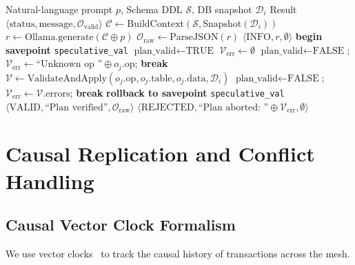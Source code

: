 \begin{algorithm}[!t]
\caption{LLM Tool-Call Decomposition and Speculative Validation}
\label{alg:llm_pipeline}
\begin{algorithmic}[1]
\Require Natural-language prompt $p$, Schema DDL $\mathcal{S}$, DB snapshot $\mathcal{D}_i$
\Ensure Result $\langle \text{status}, \text{message}, \mathcal{O}_{\text{valid}} \rangle$
\State $\mathcal{C} \gets \text{BuildContext}(\mathcal{S}, \text{Snapshot}(\mathcal{D}_i))$ 
\State $r \gets \text{Ollama.generate}(\mathcal{C} \oplus p)$ 
\State $\mathcal{O}_{\text{raw}} \gets \text{ParseJSON}(r)$ 
    \State \Return $\langle \text{INFO}, r, \emptyset \rangle$ 
\EndIf
\State \textbf{begin savepoint} \texttt{speculative\_val}
\State $\text{plan\_valid} \gets \text{TRUE}$
\State $\mathcal{V}_{\text{err}} \gets \emptyset$
        \State $\text{plan\_valid} \gets \text{FALSE}$; $\mathcal{V}_{\text{err}} \gets \text{``Unknown op ''} \oplus o_j.\text{op}$; \textbf{break}
    \EndIf
    \State $\mathcal{V} \gets \text{ValidateAndApply}(o_j.\text{op}, o_j.\text{table}, o_j.\text{data}, \mathcal{D}_i)$
        \State $\text{plan\_valid} \gets \text{FALSE}$; $\mathcal{V}_{\text{err}} \gets \mathcal{V}.\text{errors}$; \textbf{break}
    \EndIf
\EndFor
\State \textbf{rollback to savepoint} \texttt{speculative\_val}
    \State \Return $\langle \text{VALID}, \text{``Plan verified''}, \mathcal{O}_{\text{raw}} \rangle$
\Else
    \State \Return $\langle \text{REJECTED}, \text{``Plan aborted: ''} \oplus \mathcal{V}_{\text{err}}, \emptyset \rangle$
\EndIf
\end{algorithmic}
\end{algorithm}

\section{Causal Replication and Conflict Handling}
\label{sec:replication}

\subsection{Causal Vector Clock Formalism}
We use vector clocks~\cite{fidge1988timestamps, lamport1978time} to track the causal history of transactions across the mesh.

